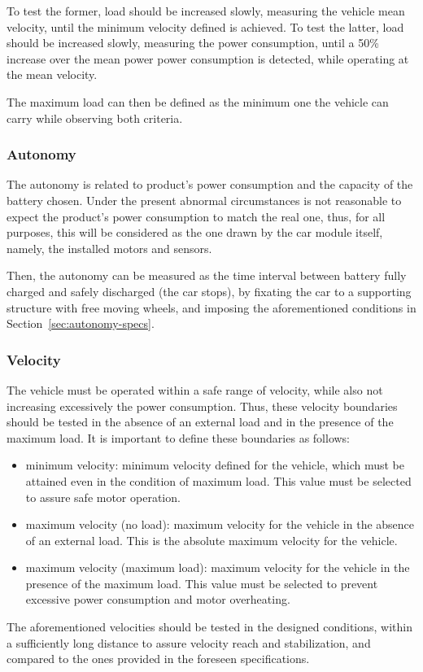 To test the former, load should be increased slowly, measuring the vehicle
mean velocity, until the minimum velocity defined is achieved. To test the
latter, load should be increased slowly, measuring the power consumption, until
a 50\% increase over the mean power power consumption is detected, while
operating at the mean velocity.

The maximum load can then be defined as the minimum one the vehicle can carry
while observing both criteria.

\subsubsection{Autonomy}%
\label{sec:org532616f}
The autonomy is related to product's power consumption and the capacity of the
battery chosen. Under the present abnormal circumstances is not reasonable to
expect the product's power consumption to match the real one, thus, for all
purposes, this will be considered as the one drawn by the car module itself,
namely, the installed motors and sensors.

Then, the autonomy can be measured as the time interval between battery fully
charged and safely discharged (the car stops), by fixating the car to a
supporting structure with free moving wheels, and imposing the aforementioned
conditions in Section~\ref{sec:autonomy-specs}.

\subsubsection{Velocity}%
\label{sec:org20789b4}
The vehicle must be operated within a safe range of velocity, while also not
increasing excessively the power consumption. Thus, these velocity boundaries
should be tested in the absence of an external load and in the presence of the
maximum load. It is important to define these boundaries as follows:
\begin{itemize}
\item minimum velocity: minimum velocity defined for the vehicle, which must be
  attained even in the condition of maximum load. This value must be selected to
  assure safe motor operation.
\item maximum velocity (no load): maximum velocity for the vehicle in the
  absence of an external load. This is the absolute maximum velocity for the
  vehicle.
\item maximum velocity (maximum load): maximum velocity for the vehicle in the
  presence of the maximum load. This value must be selected to prevent excessive
  power consumption and motor overheating.
\end{itemize}
The aforementioned velocities should be tested in the designed conditions,
within a sufficiently long distance to assure velocity reach and stabilization,
and compared to the ones provided in the foreseen specifications.

